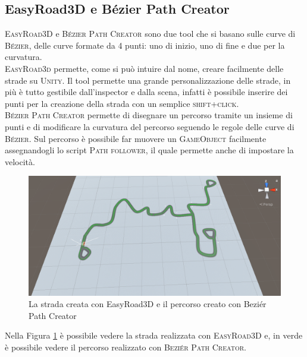 \documentclass[12pt, openany]{book}
\begin{document}
	\subsection{EasyRoad3D e Bézier Path Creator}
	\textsc{EasyRoad3D} \cite{EasyRoad3D} e \textsc{Bézier Path Creator} \cite{Bezier}
	sono due tool che si basano sulle curve di \textsc{Bézier}, delle curve formate da 4 punti: uno di inizio, uno di fine e due per la curvatura. \\
	\textsc{EasyRoad3d} permette, come si può intuire dal nome, creare facilmente delle strade su \textsc{Unity}. Il tool permette una grande personalizzazione delle strade, in più è tutto gestibile dall'inspector e dalla scena, infatti è possibile inserire dei punti per la creazione della strada con un semplice \textsc{shift+click}.\\
	\textsc{Bézier Path Creator} permette di disegnare un percorso tramite un insieme di punti e di modificare la curvatura del percorso seguendo le regole delle curve di \textsc{Bézier}. Sul percorso è possibile far muovere un \textsc{GameObject} facilmente assegnandogli lo script \textsc{Path follower}, il quale permette anche di impostare la velocità.
		\begin{figure}[H]
		\centering
		\includegraphics[width=1\linewidth]{"Immagini/EasyRoad+Bezier.png"}
		\caption{La strada creata con EasyRoad3D e il percorso creato con Beziér Path Creator}
		\label{fig:E+B}
	\end{figure}
	Nella Figura \ref{fig:E+B} è possibile vedere la strada realizzata con \textsc{EasyRoad3D} e, in verde è possibile vedere il percorso realizzato con \textsc{Beziér Path Creator}.
	
\end{document}
